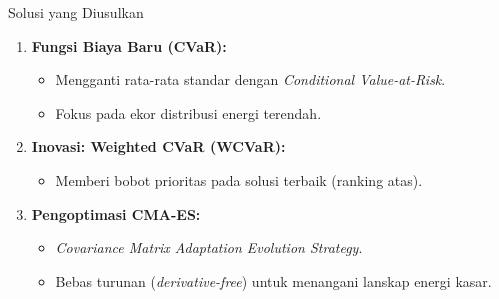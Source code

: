 \documentclass[10pt]{beamer}
\begin{document}
\begin{frame}{Solusi yang Diusulkan}
    \begin{enumerate}
        \item \textbf{Fungsi Biaya Baru (CVaR):}
        \begin{itemize}
            \item Mengganti rata-rata standar dengan \textit{Conditional Value-at-Risk}.
            \item Fokus pada ekor distribusi energi terendah.
        \end{itemize}
        \vspace{0.3cm}
        \item \textbf{Inovasi: Weighted CVaR (WCVaR):}
        \begin{itemize}
            \item Memberi bobot prioritas pada solusi terbaik (ranking atas).
        \end{itemize}
        \vspace{0.3cm}
        \item \textbf{Pengoptimasi CMA-ES:}
        \begin{itemize}
            \item \textit{Covariance Matrix Adaptation Evolution Strategy}.
            \item Bebas turunan (\textit{derivative-free}) untuk menangani lanskap energi kasar.
        \end{itemize}
    \end{enumerate}
\end{frame}

\end{document}
